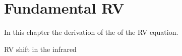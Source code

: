 
\chapter{Fundamental RV}
\label{cha:concepts}

In this chapter the derivation of the of the RV equation. 





RV shift in the infrared